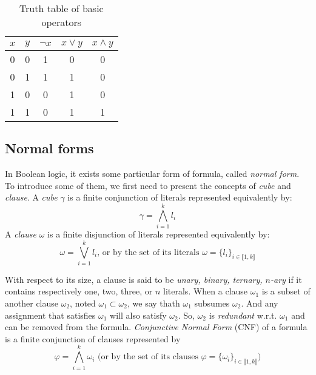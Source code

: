 \begin{table}[!htbp]
 \centering
 \begin{tabular}{cc|ccc}
  $x$ & $y$ & $\neg x$ & $x \lor y$ & $x \land y$ \\
  \toprule
  0 & 0 & 1 & 0 & 0 \\
  \midrule
  0 & 1 & 1 & 1 & 0 \\
  \midrule
  1 & 0 & 0 & 1 & 0 \\
  \midrule
  1 & 1 & 0 & 1 & 1 \\
  \bottomrule
 \end{tabular}
 \caption{Truth table of basic operators}
 \label{tab:truthtable}
\end{table}
\subsection{Normal forms}
In Boolean logic, it exists some particular form of formula, called \emph{normal form}.
To introduce some of them, we first need to present the concepts of \emph{cube} and \emph{clause}.
A \emph{cube} $\gamma$ is a finite conjunction of literals represented equivalently by:
$$\gamma = \bigwedge_{i=1}^k l_i $$
A \emph{clause} $\omega$ is a finite disjunction of literals represented equivalently by:
$$\omega = \bigvee_{i=1}^k l_i \text{, or by the set of its literals } \omega = \{l_i\}_{i \in \llbracket 1,k \rrbracket}$$
 
With respect to its size, a clause is said to be \emph{unary, binary, ternary, $n$-ary} if it contains respectively one, two, three, or $n$ literals.
When a clause $\omega_1$ is a subset of another clause $\omega_2$, noted $\omega_1 \subset \omega_2$,
we say thath $\omega_{1}$ subsumes $\omega_{2}$.
 And any assignment that satisfies $\omega_1$ will also satisfy $\omega_2$. So, $\omega_2$ is \emph{redundant} w.r.t. $\omega_1$ and can be removed from the formula.
\emph{Conjunctive Normal Form} (CNF) of a formula is a finite conjunction of clauses represented by
  $$\varphi = \bigwedge_{i=1}^k \omega_i \text{ (or by the set of its clauses } \varphi = \{\omega_i\}_{i \in \llbracket 1,k \rrbracket}\text{)}$$
  
